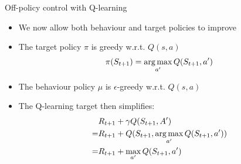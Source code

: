 \bgroup
\begin{frame}{Off-policy control with Q-learning}
\begin{itemize}
\item We now allow both behaviour and target policies to \textcolor{mImagelabRed}{improve}
\item The target policy $\pi$ is \textcolor{mImagelabRed}{greedy} w.r.t. $Q(s, a)$
\begin{equation*}
\pi(S_{t+1}) = \operatorname*{arg\,max}_{a^{\prime}}Q(S_{t+1}, a^{\prime})
\end{equation*}
\item The behaviour policy $\mu$ is \textcolor{mImagelabRed}{$\epsilon$-greedy} w.r.t. $Q(s, a)$
\item The Q-learning target then simplifies:
\begin{align*}
& R_{t+1} + \gamma Q(S_{t+1}, A^{\prime})\\
=& R_{t+1} + Q(S_{t+1}, \operatorname*{arg\,max}_{a^{\prime}} Q(S_{t+1}, a^{\prime}))\\
=& R_{t+1} + \max_{a^{\prime}}Q(S_{t+1},a^{\prime})
\end{align*}
\end{itemize}
\end{frame}
\egroup